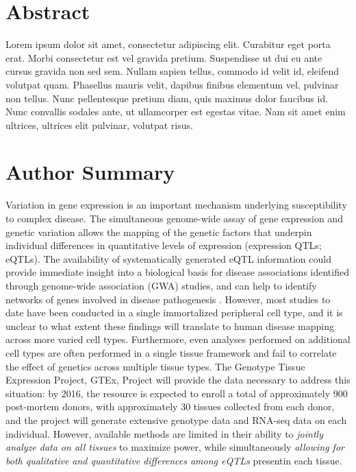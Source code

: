 \documentclass[10pt,letterpaper]{article}
\begin{document}
\section*{Abstract}
Lorem ipsum dolor sit amet, consectetur adipiscing elit. Curabitur eget porta erat. Morbi consectetur est vel gravida pretium. Suspendisse ut dui eu ante cursus gravida non sed sem. Nullam sapien tellus, commodo id velit id, eleifend volutpat quam. Phasellus mauris velit, dapibus finibus elementum vel, pulvinar non tellus. Nunc pellentesque pretium diam, quis maximus dolor faucibus id. Nunc convallis sodales ante, ut ullamcorper est egestas vitae. Nam sit amet enim ultrices, ultrices elit pulvinar, volutpat risus.


\section*{Author Summary}
Variation in gene expression is an important mechanism underlying susceptibility to complex disease. The simultaneous genome-wide assay of gene expression and genetic variation allows the mapping of the genetic factors that underpin individual differences in quantitative levels of expression (expression QTLs; eQTLs). The availability of systematically generated eQTL information could provide immediate insight into a biological basis for disease associations identified through genome-wide association (GWA) studies, and can help to identify networks of genes 
involved in disease pathogenesis \cite{cookson_mapping_2009}. However, most studies to date have been conducted in a single immortalized peripheral cell type, and it is unclear to what extent these findings will translate to human disease mapping across more varied cell types. 
Furthermore, even analyses performed on additional cell types are often performed in a single tissue framework \cite{majewski_study_2011,gilad_revealing_2008} and fail to correlate the effect of genetics across multiple tissue types.  The Genotype Tissue Expression Project, GTEx, Project will provide the data necessary to address this situation: by 2016, the resource is expected to enroll a total of approximately 900 post-mortem donors, with approximately 30 tissues collected from each donor, and the project
will generate extensive genotype data and RNA-seq data on each individual. However,  available methods are limited in their ability to {\it jointly analyze data on all tissues} to maximize power, while
simultaneously {\it allowing for both qualitative and quantitative differences among eQTLs} presentin each tissue.
\end{document}
